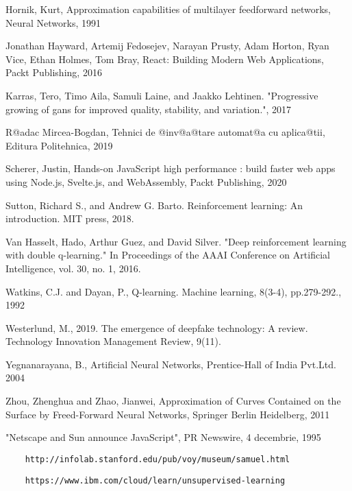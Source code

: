 \begin{thebibliography}{99}
 Hornik, Kurt, Approximation capabilities of multilayer feedforward networks, Neural Networks, 1991

 Jonathan Hayward, Artemij Fedosejev, Narayan Prusty, Adam Horton, Ryan Vice, Ethan Holmes, Tom Bray, React: Building Modern Web Applications, Packt Publishing, 2016    

 Karras, Tero, Timo Aila, Samuli Laine, and Jaakko Lehtinen. "Progressive growing of gans for improved quality, stability, and variation.", 2017

 R@adac Mircea-Bogdan, Tehnici de @inv@a@tare automat@a cu aplica@tii, Editura Politehnica, 2019

 Scherer, Justin, Hands-on JavaScript high performance : build faster web apps using Node.js, Svelte.js, and WebAssembly, Packt Publishing, 2020

 Sutton, Richard S., and Andrew G. Barto. Reinforcement learning: An introduction. MIT press, 2018.

 Van Hasselt, Hado, Arthur Guez, and David Silver. "Deep reinforcement learning with double q-learning." In Proceedings of the AAAI Conference on Artificial Intelligence, vol. 30, no. 1, 2016.

 Watkins, C.J. and Dayan, P., Q-learning. Machine learning, 8(3-4), pp.279-292., 1992

 Westerlund, M., 2019. The emergence of deepfake technology: A review. Technology Innovation Management Review, 9(11).

 Yegnanarayana, B., Artificial Neural Networks, Prentice-Hall of India Pvt.Ltd. 2004

 Zhou, Zhenghua and Zhao, Jianwei, Approximation of Curves Contained on the Surface by Freed-Forward Neural Networks, Springer Berlin Heidelberg, 2011

 "Netscape and Sun announce JavaScript", PR Newswire, 4 decembrie, 1995

 \begin{verbatim}
	http://infolab.stanford.edu/pub/voy/museum/samuel.html
\end{verbatim}

 \begin{verbatim}
	https://www.ibm.com/cloud/learn/unsupervised-learning
\end{verbatim}


\end{thebibliography}
